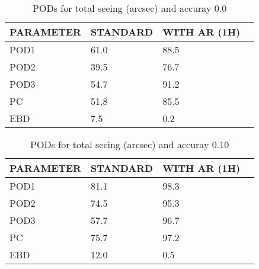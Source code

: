 \documentclass[11pt,english]{article}
\begin{document}
\newpage

\clearpage
\begin{table}[]
\begin{center}
\begin{tabular}{|l|l|l|l|}
\hline
\multicolumn{1}{|c|}{\cellcolor[HTML]{C0C0C0}\textbf{PARAMETER}} & \multicolumn{1}{c|}{\cellcolor[HTML]{C0C0C0}\textbf{STANDARD}} & \multicolumn{1}{c|}{\cellcolor[HTML]{C0C0C0}\textbf{WITH AR (1H)}} \\
\hline
\cellcolor[HTML]{C0C0C0}POD1  & 61.0                                & 88.5         \\
\cellcolor[HTML]{C0C0C0}POD2  & 39.5                                & 76.7         \\
\cellcolor[HTML]{C0C0C0}POD3  & 54.7                                & 91.2         \\
\cellcolor[HTML]{C0C0C0}PC    & 51.8                                  & 85.5           \\
\cellcolor[HTML]{C0C0C0}EBD   & 7.5                                 & 0.2          \\
\hline
\end{tabular}
\caption{PODs for total seeing (arcsec) and accuray 0.0}
\end{center}
\end{table}
\begin{table}[]
\begin{center}
\begin{tabular}{|l|l|l|l|}
\hline
\multicolumn{1}{|c|}{\cellcolor[HTML]{C0C0C0}\textbf{PARAMETER}} & \multicolumn{1}{c|}{\cellcolor[HTML]{C0C0C0}\textbf{STANDARD}} & \multicolumn{1}{c|}{\cellcolor[HTML]{C0C0C0}\textbf{WITH AR (1H)}} \\
\hline
\cellcolor[HTML]{C0C0C0}POD1  & 81.1                                & 98.3         \\
\cellcolor[HTML]{C0C0C0}POD2  & 74.5                                & 95.3         \\
\cellcolor[HTML]{C0C0C0}POD3  & 57.7                                & 96.7         \\
\cellcolor[HTML]{C0C0C0}PC    & 75.7                                  & 97.2           \\
\cellcolor[HTML]{C0C0C0}EBD   & 12.0                                 & 0.5          \\
\hline
\end{tabular}
\caption{PODs for total seeing (arcsec) and accuray 0.10}
\end{center}
\end{table}
\end{document}

